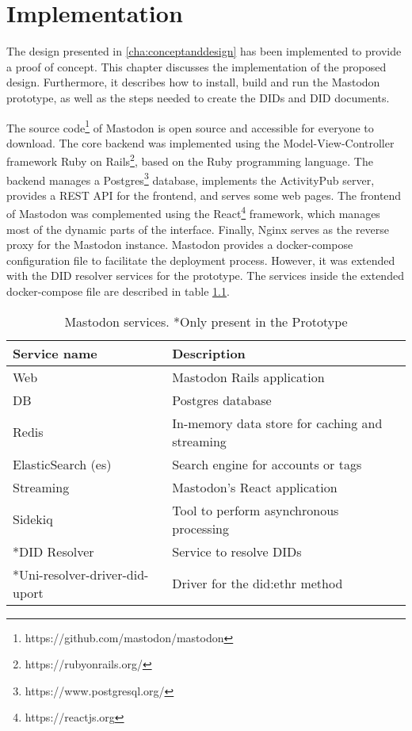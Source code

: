 \chapter{Implementation}
\label{cha:implementation}

The design presented in \ref{cha:conceptanddesign} has been implemented to provide a proof of concept. This chapter discusses the implementation of the proposed design. Furthermore, it describes how to install, build and run the Mastodon prototype, as well as the steps needed to create the DIDs and DID documents. 

The source code\footnote{https://github.com/mastodon/mastodon} of Mastodon is open source and accessible for everyone to download. The core backend was implemented using the Model-View-Controller framework Ruby on Rails\footnote{https://rubyonrails.org/}, based on the Ruby programming language. The backend manages a Postgres\footnote{https://www.postgresql.org/} database, implements the ActivityPub server, provides a REST API for the frontend, and serves some web pages. The frontend of Mastodon was complemented using the React\footnote{https://reactjs.org} framework, which manages most of the dynamic parts of the interface. Finally, Nginx serves as the reverse proxy for the Mastodon instance.  
Mastodon provides a docker-compose configuration file to facilitate the deployment process. However, it was extended with the DID resolver services for the prototype. The services inside the extended docker-compose file are described in table \ref{table:mastodon_service}.

\begin{table}[H]
  \centering
  \begin{tabular}{|p{5cm}|p{10cm}| }
    \hline
    \textbf{Service name} & \textbf{Description} \\
    \hline
    \hline
    Web & Mastodon Rails application \\
    \hline
    DB & Postgres database \\
    \hline
    Redis & In-memory data store for caching and streaming \\
    \hline
    ElasticSearch (es) & Search engine for accounts or tags\\
    \hline
    Streaming & Mastodon's React application \\
    \hline
    Sidekiq & Tool to perform asynchronous processing\\
    \hline
    *DID Resolver & Service to resolve DIDs \\
    \hline
    *Uni-resolver-driver-did-uport & Driver for the did:ethr method\\
    \hline
  \end{tabular}
  \caption{Mastodon services. *Only present in the Prototype}
  \label{table:mastodon_service}
\end{table}


